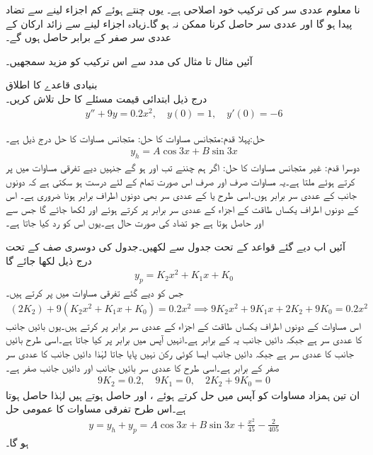 نا معلوم عددی سر کی  ترکیب خود اصلاحی ہے۔ یوں  چنتے ہوئے کم اجزاء لینے سے تضاد پیدا ہو گا اور عددی سر حاصل کرنا ممکن نہ ہو گا۔زیادہ اجزاء لینے سے زائد ارکان کے عددی سر صفر کے برابر حاصل ہوں گے۔

آئیں مثال  تا مثال  کی مدد سے اس ترکیب کو مزید سمجھیں۔

 \quad بنیادی قاعدے کا اطلاق\\
درج ذیل ابتدائی قیمت مسئلے کا حل تلاش کریں۔
\begin{align*}
y''+9 y=0.2x^2, \quad y(0)=1, \quad y'(0)=-6
\end{align*}

حل:پہلا قدم:متجانس مساوات کا حل: \quad متجانس مساوات  کا حل   درج ذیل ہے۔
\begin{align*}
y_h=A\cos 3 x+B\sin 3 x
\end{align*}
دوسرا قدم: غیر متجانس مساوات کا حل: \quad اگر ہم  چننے تب  اور  ہو گے جنہیں دیے تفرقی مساوات میں پر کرتے ہوئے   ملتا ہے۔یہ مساوات صرف اور صرف اس صورت تمام  کے لئے درست ہو سکتی ہے کہ دونوں جانب  کے عددی سر برابر ہوں۔اسی طرح  یا  کے عددی سر بھی دونوں اطراف برابر ہونا ضروری ہے۔ اس کے دونوں اطراف یکساں طاقت کے اجزاء کے عددی سر برابر پر کرتے ہوئے  اور  لکھا جائے گا جس سے  اور  حاصل ہوتا ہے جو تضاد کی صورت حال ہے۔یوں اس  کو رد کیا جاتا ہے۔

آئیں اب دیے گئے قواعد کے تحت  جدول  سے  لکھیں۔جدول کی دوسری صف کے تحت درج ذیل لکھا جائے گا
\begin{align*}
y_p=K_2x^2+K_1x+K_0
\end{align*}
جس کو دیے گئے تفرقی مساوات میں پر کرتے ہیں۔
\begin{align*}
(2K_2)+9(K_2x^2+K_1x+K_0)=0.2x^2 \implies 9K_2 x^2 +9K_1x+2K_2+9K_0=0.2x^2
\end{align*}
اس مساوات کے دونوں اطراف یکساں طاقت کے اجزاء کے عددی سر برابر پر کرتے ہیں۔یوں بائیں جانب  کا عددی سر  ہے جبکہ دائیں جانب یہ  کے برابر ہے۔انہیں آپس میں برابر پر کیا جاتا ہے۔اسی طرح بائیں جانب  کا عددی سر  ہے جبکہ دائیں جانب ایسا کوئی رکن نہیں پایا جاتا لہٰذا دائیں جانب  کا عددی سر صفر کے برابر ہے۔اسی طرح  کا عددی سر بائیں جانب  اور دائیں جانب صفر ہے۔
\begin{align*}
9K_2=0.2, \quad  9K_1=0, \quad 2K_2+9K_0=0
\end{align*}
ان تین ہمزاد مساوات کو آپس میں حل کرتے ہوئے ،  اور  حاصل ہوتے ہیں لہٰذا 
 حاصل ہوتا ہے۔اس طرح تفرقی مساوات کا عمومی حل 
\begin{align*}
y=y_h+y_p=A\cos 3 x+B\sin 3 x+\frac{x^2}{45}-\frac{2}{405}
\end{align*}
ہو گا۔

